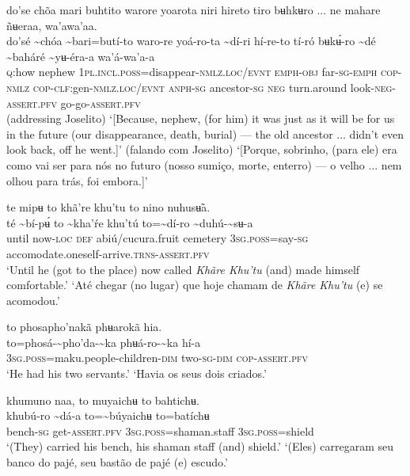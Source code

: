 \documentclass[output=paper,
modfonts,nonflat
]{langsci/langscibook}
\begin{document}
\ea do'se chõa mari buhtito warore yoarota niri hireto tiro bʉhkʉro ... ne mahare ñʉeraa, wa’awa’aa. \\[.3em]
\gll do'sé	{\textasciitilde}chóa	{\textasciitilde}bari=butí-to	waro-re	yoá-ro-ta {\textasciitilde}dí-ri	hí-re-to	tí-ró	bʉkʉ́-ro {\textasciitilde}dé	{\textasciitilde}baháré	{\textasciitilde}yʉ-éra-a 	wa'á-wa'a-a\\
     \textsc{q:}how	nephew	1\textsc{pl.incl.poss}=disappear-\textsc{nmlz.loc/evnt}	\textsc{emph-obj}	far\textsc{-sg-emph} \textsc{cop-nmlz}	\textsc{cop-clf:}gen-\textsc{nmlz.loc/evnt}	\textsc{anph-sg}	ancestor\textsc{-sg} \textsc{neg}	turn.around	look\textsc{-neg-assert.pfv}	go-go-\textsc{assert.pfv}\\
\glt (addressing Joselito) ‘[Because, nephew, (for him) it was just as it will be for us in the future (our disappearance, death, burial) — the old ancestor ... didn't even look back, off he went.]’
\glt (falando com Joselito) ‘[Porque, sobrinho, (para ele) era como vai ser para nós no futuro (nosso sumiço, morte, enterro) — o velho ... nem olhou para trás, foi embora.]’
\z 

\ea  te mipʉ to khã're khu'tu to nino nuhusʉ̃a. \\[.3em]
\gll  té	{\textasciitilde}bí-pʉ́	to	{\textasciitilde}kha'ŕe	khu'tú	to={\textasciitilde}dí-ro	{\textasciitilde}duhú-{\textasciitilde}sʉ-a\\
     until	now\textsc{-loc}	\textsc{def}	abiú/cucura.fruit	cemetery	3\textsc{sg.poss}=say-\textsc{sg}	accomodate.oneself-arrive.\textsc{trns}-\textsc{assert.pfv}\\
\glt ‘Until he (got to the place) now called \textit{Khãre Khu’tu} (and) made himself comfortable.’
\glt ‘Até chegar (no lugar) que hoje chamam de \textit{Khãre Khu’tu} (e) se acomodou.’
\z 

\ea to phosapho'nakã phʉarokã hia.  \\[.3em]
\gll to=phosá-{\textasciitilde}pho'da-{\textasciitilde}ka	phʉá-ro-{\textasciitilde}ka	hí-a \\
     3\textsc{sg.poss}=maku.people-children-\textsc{dim}	two\textsc{-sg-dim}	\textsc{cop-assert.pfv}\\
\glt ‘He had his two servants.’
\glt ‘Havia os seus dois criados.’
\z 

\ea khumuno naa, to muyaichʉ to bahtichʉ. \\[.3em]
\gll {\textasciitilde}khubú-ro	{\textasciitilde}dá-a	to={\textasciitilde}búyaichʉ	to=batíchʉ \\
     bench\textsc{-sg}	get-\textsc{assert.pfv}	3\textsc{sg.poss}=shaman.staff	3\textsc{sg.poss}=shield\\
\glt ‘(They) carried his bench, his shaman staff (and) shield.’
\glt ‘(Eles) carregaram seu banco do pajé, seu bastão de pajé (e) escudo.’
\z
\end{document}
